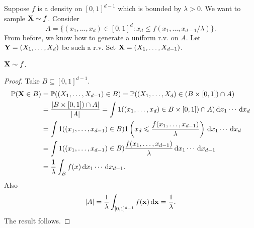 Suppose $f$ is a density on $ [0,1]^{d-1} $ which is bounded by $ \lambda>0 $. We want to sample $ {\bf X} \sim f $. Consider 
\[
    A = \{(x_1,\dots,x_d)\in [0,1]^d:x_d\le f(x_1,\dots,x_{d-1}/\lambda)\}.
\]
From before, we know how to generate a uniform r.v. on $A$. Let $ {\bf Y}=(X_1,\dots,X_d) $ be such a r.v. Set $ {\bf X} = (X_1,\dots,X_{d-1}) $.

\begin{claim}
    $ {\bf X} \sim f $.
\end{claim}

\begin{proof}
    Take $ B \subseteq [0,1]^{d-1} $.
    \begin{align*}
        \mathbb{P}({\bf X}\in B)&= \mathbb{P}((X_1,\dots,X_{d-1})\in B)=\mathbb{P}((X_1,\dots,X_d)\in (B \times [0,1])\cap A)\\ 
        &= \frac{|B \times [0,1])\cap A|}{|A|} = \int 1((x_1,\dots,x_d)\in B \times [0,1])\cap A) \,\mathrm{d}x_1\cdots\,\mathrm{d} x_d\\ 
        &= \int 1((x_1,\dots,x_{d-1})\in B)1\left( x_d\leqslant \frac{f(x_1,\dots,x_{d-1})}{\lambda} \right) \,\mathrm{d}x_1\cdots\,\mathrm{d} x_d\\ 
        &= \int 1((x_1,\dots,x_{d-1})\in B)\frac{f(x_1,\dots,x_{d-1})}{\lambda} \,\mathrm{d}x_1\cdots\,\mathrm{d} x_{d-1}\\
        &= \frac{1}{\lambda}\int_B f(x) \,\mathrm{d}x_1\cdots\,\mathrm{d} x_{d-1}.
    \end{align*}
    Also 
    \[
        |A|=\frac{1}{\lambda}\int_{[0,1]^{d-1}} f({\bf x}) \,\mathrm{d}{\bf x}=\frac{1}{\lambda}.
    \]
    The result follows.
\end{proof}